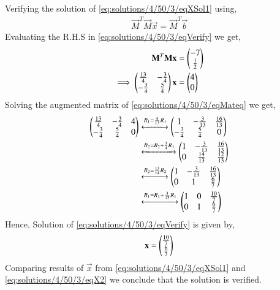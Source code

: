 Verifying the solution of \eqref{eq:solutions/4/50/3/eqXSol1} using,
\begin{align}
\vec{M}^T\vec{M}\vec{x} = \vec{M}^T\vec{b}\label{eq:solutions/4/50/3/eqVerify}
\end{align}
Evaluating the R.H.S in \eqref{eq:solutions/4/50/3/eqVerify} we get,
\begin{align}
\mathbf{M}^T\mathbf{M}\mathbf{x} &= \begin{pmatrix}-7\\\frac{1}{2}\end{pmatrix}\\
\implies\begin{pmatrix}\frac{13}{4}& -\frac{3}{4}\\ -\frac{3}{4}&\frac{5}{4}\end{pmatrix}\mathbf{x} &= \begin{pmatrix}4\\0\end{pmatrix}\label{eq:solutions/4/50/3/eqMateq}
\end{align}
Solving the augmented matrix of \eqref{eq:solutions/4/50/3/eqMateq} we get,
\begin{align}
\begin{pmatrix}\frac{13}{4}&-\frac{3}{4}& 4 \\-\frac{3}{4}&\frac{5}{4}& 0\end{pmatrix} &\xleftrightarrow{R_1=\frac{4}{13}R_1}\begin{pmatrix}1&-\frac{3}{13}&\frac{16}{13}\\ -\frac{3}{4}&\frac{5}{4}&0\end{pmatrix}\\
&\xleftrightarrow{R_2=R_2+\frac{3}{4}R_1}\begin{pmatrix}1&-\frac{3}{13}&\frac{16}{13}\\0 & \frac{14}{13}&\frac{12}{13}\end{pmatrix}\\
&\xleftrightarrow{R_2=\frac{13}{14}R_2}\begin{pmatrix}1& -\frac{3}{13}&\frac{16}{13}\\ 0 & 1 &\frac{6}{7}\end{pmatrix}\\
&\xleftrightarrow{R_1=R_1+\frac{3}{13}R_1}\begin{pmatrix}1&0&\frac{10}{7}\\0&1&\frac{6}{7}\end{pmatrix}
\end{align}
Hence, Solution of \eqref{eq:solutions/4/50/3/eqVerify} is given by,
\begin{align}
\mathbf{x}=\begin{pmatrix}\frac{10}{7}\\\frac{6}{7}\end{pmatrix}\label{eq:solutions/4/50/3/eqX2}
\end{align}
Comparing results of $\vec{x}$ from \eqref{eq:solutions/4/50/3/eqXSol1} and \eqref{eq:solutions/4/50/3/eqX2} we conclude that the solution is verified.















